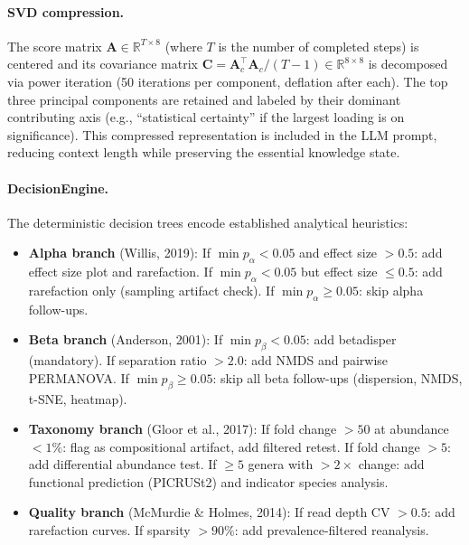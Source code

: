 \documentclass[11pt,a4paper]{article}
\begin{document}
\paragraph{SVD compression.}
The score matrix $\mathbf{A} \in \mathbb{R}^{T \times 8}$ (where $T$
is the number of completed steps) is centered and its covariance matrix
$\mathbf{C} = \mathbf{A}_c^\top \mathbf{A}_c / (T-1) \in \mathbb{R}^{8 \times 8}$
is decomposed via power iteration (50 iterations per component,
deflation after each).
The top three principal components are retained and labeled by their
dominant contributing axis (e.g., ``statistical certainty'' if the
largest loading is on significance).
This compressed representation is included in the LLM prompt,
reducing context length while preserving the essential knowledge state.

\paragraph{DecisionEngine.}
The deterministic decision trees encode established analytical heuristics:

\begin{itemize}
  \item \textbf{Alpha branch} (Willis, 2019):
    If $\min p_\alpha < 0.05$ and effect size $> 0.5$: add effect size
    plot and rarefaction.
    If $\min p_\alpha < 0.05$ but effect size $\leq 0.5$: add
    rarefaction only (sampling artifact check).
    If $\min p_\alpha \geq 0.05$: skip alpha follow-ups.

  \item \textbf{Beta branch} (Anderson, 2001):
    If $\min p_\beta < 0.05$: add betadisper (mandatory).
    If separation ratio $> 2.0$: add NMDS and pairwise PERMANOVA.
    If $\min p_\beta \geq 0.05$: skip all beta follow-ups
    (dispersion, NMDS, t-SNE, heatmap).

  \item \textbf{Taxonomy branch} (Gloor et al., 2017):
    If fold change $> 50$ at abundance $< 1\%$: flag as
    compositional artifact, add filtered retest.
    If fold change $> 5$: add differential abundance test.
    If $\geq 5$ genera with $> 2\times$ change: add functional
    prediction (PICRUSt2) and indicator species analysis.

  \item \textbf{Quality branch} (McMurdie \& Holmes, 2014):
    If read depth CV $> 0.5$: add rarefaction curves.
    If sparsity $> 90\%$: add prevalence-filtered reanalysis.
\end{itemize}
\end{document}
